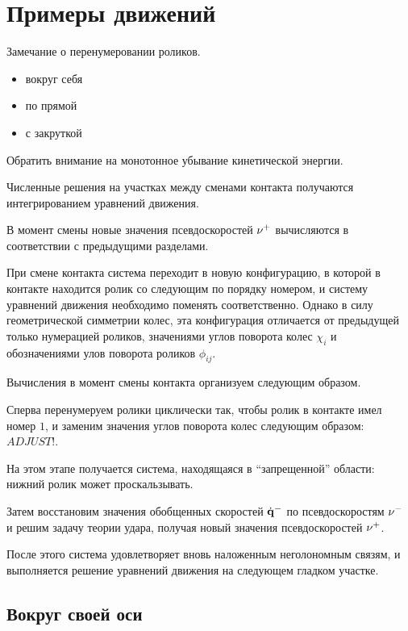 
\section{Примеры движений}

Замечание о перенумеровании роликов.
\begin{itemize}
    \item вокруг себя
    \item по прямой
    \item с закруткой
\end{itemize}

Обратить внимание на монотонное убывание кинетической энергии.

Численные решения на участках между сменами контакта получаются интегрированием уравнений движения.

В момент смены новые значения псевдоскоростей $\mathbf{\nu}^+$ вычисляются в соответствии с предыдущими разделами.

При смене контакта система переходит в новую конфигурацию, в которой в контакте находится ролик со следующим по порядку номером, и систему уравнений движения необходимо поменять соответственно. Однако в силу геометрической симметрии колес, эта конфигурация отличается от предыдущей только нумерацией роликов, значениями углов поворота колес $\chi_i$ и обозначениями улов поворота роликов $\phi_{ij}$.

Вычисления в момент смены контакта организуем следующим образом.

Сперва перенумеруем ролики циклически так, чтобы ролик в контакте имел номер $1$, и заменим значения углов поворота колес следующим образом: $ADJUST!$.

На этом этапе получается система, находящаяся в ``запрещенной'' области: нижний ролик может проскальзывать.

Затем восстановим значения обобщенных скоростей $\dot{\mathbf{q}}^-$ по псевдоскоростям $\mathbf{\nu}^-$ и решим задачу теории удара, получая новый значения псевдоскоростей $\mathbf{\nu}^+$.

После этого система удовлетворяет вновь наложенным неголономным связям, и выполняется решение уравнений движения на следующем гладком участке.

\newpage

\subsection{Вокруг своей оси}

